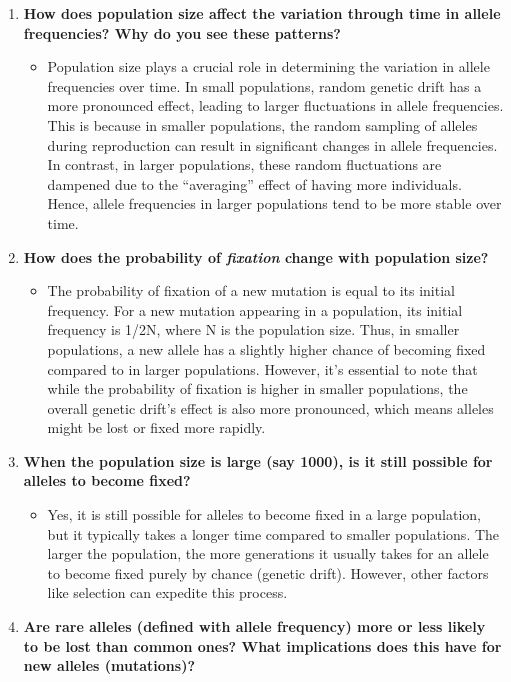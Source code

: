 \documentclass[
  a4paper]{book}
\providecommand{\tightlist}{%
  \setlength{\itemsep}{0pt}\setlength{\parskip}{0pt}}
\begin{document}
\begin{enumerate}
\def\labelenumi{\arabic{enumi}.}
\tightlist
\item
  \textbf{How does population size affect the variation through time in allele frequencies? Why do you see these patterns?}

  \begin{itemize}
  \tightlist
  \item
    Population size plays a crucial role in determining the variation in allele frequencies over time. In small populations, random genetic drift has a more pronounced effect, leading to larger fluctuations in allele frequencies. This is because in smaller populations, the random sampling of alleles during reproduction can result in significant changes in allele frequencies. In contrast, in larger populations, these random fluctuations are dampened due to the ``averaging'' effect of having more individuals. Hence, allele frequencies in larger populations tend to be more stable over time.
  \end{itemize}
\item
  \textbf{How does the probability of \emph{fixation} change with population size?}

  \begin{itemize}
  \tightlist
  \item
    The probability of fixation of a new mutation is equal to its initial frequency. For a new mutation appearing in a population, its initial frequency is 1/2N, where N is the population size. Thus, in smaller populations, a new allele has a slightly higher chance of becoming fixed compared to in larger populations. However, it's essential to note that while the probability of fixation is higher in smaller populations, the overall genetic drift's effect is also more pronounced, which means alleles might be lost or fixed more rapidly.
  \end{itemize}
\item
  \textbf{When the population size is large (say 1000), is it still possible for alleles to become fixed?}

  \begin{itemize}
  \tightlist
  \item
    Yes, it is still possible for alleles to become fixed in a large population, but it typically takes a longer time compared to smaller populations. The larger the population, the more generations it usually takes for an allele to become fixed purely by chance (genetic drift). However, other factors like selection can expedite this process.
  \end{itemize}
\item
  \textbf{Are rare alleles (defined with allele frequency) more or less likely to be lost than common ones? What implications does this have for new alleles (mutations)?}


\end{enumerate}
\end{document}
